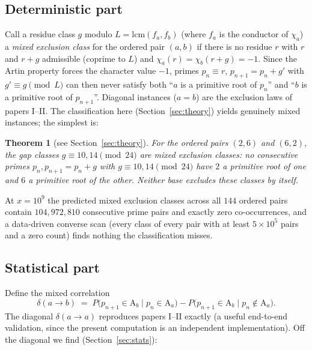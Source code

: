 \documentclass[11pt,reqno]{amsart}
\theoremstyle{plain}
\newtheorem{theorem}{Theorem}
\theoremstyle{definition}
\newcommand{\Art}{\mathrm{A}}
\begin{document}
\subsection*{Deterministic part}
Call a residue class $g$ modulo $L = \mathrm{lcm}(f_a, f_b)$ (where $f_a$ is
the conductor of $\chi_a$) a \emph{mixed exclusion class} for the ordered pair
$(a, b)$ if there is no residue $r$ with $r$ and $r + g$ admissible
(coprime to $L$) and $\chi_a(r) = \chi_b(r + g) = -1$. Since the Artin
property forces the character value $-1$, primes $p_n \equiv r$,
$p_{n+1} = p_n + g'$ with $g' \equiv g \pmod L$ can then never satisfy both
``$a$ is a primitive root of $p_n$'' and ``$b$ is a primitive root of
$p_{n+1}$''. Diagonal instances ($a = b$) are the exclusion laws of papers
I--II. The classification here (Section~\ref{sec:theory}) yields genuinely
mixed instances; the simplest is:

\begin{theorem}[see Section~\ref{sec:theory}]
\label{thm:mixedintro}
For the ordered pairs $(2, 6)$ and $(6, 2)$, the gap classes
$g \equiv 10, 14 \pmod{24}$ are mixed exclusion classes: no consecutive
primes $p_n, p_{n+1} = p_n + g$ with $g \equiv 10, 14 \pmod{24}$ have $2$ a
primitive root of one and $6$ a primitive root of the other. Neither base
excludes these classes by itself.
\end{theorem}

At $x = 10^9$ the predicted mixed exclusion classes across all $144$ ordered
pairs contain $104{,}972{,}810$ consecutive prime pairs and exactly zero
co-occurrences, and a data-driven converse scan (every class of every pair
with at least $5 \times 10^5$ pairs and a zero count) finds nothing the
classification misses.

\subsection*{Statistical part}
Define the mixed correlation
\[
  \delta(a \to b) \;=\;
  P\bigl(p_{n+1} \in \Art_b \mid p_n \in \Art_a\bigr) -
  P\bigl(p_{n+1} \in \Art_b \mid p_n \notin \Art_a\bigr).
\]
The diagonal $\delta(a \to a)$ reproduces papers I--II exactly (a useful
end-to-end validation, since the present computation is an independent
implementation). Off the diagonal we find
(Section~\ref{sec:stats}):
\end{document}
